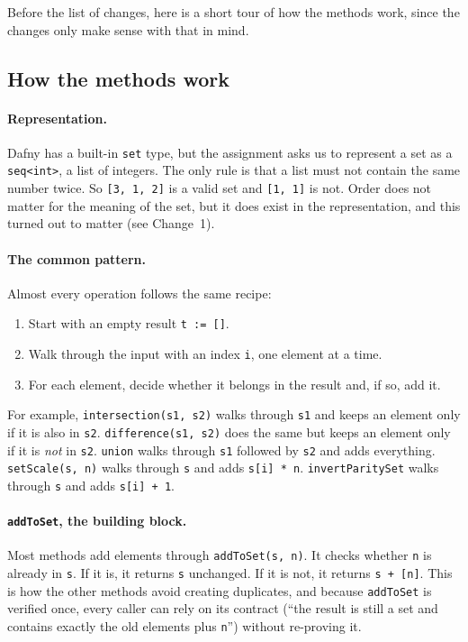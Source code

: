 \documentclass[11pt,a4paper]{article}
\begin{document}
Before the list of changes, here is a short tour of how the methods work, since the changes only make sense with that in mind.

\subsection{How the methods work}

\paragraph{Representation.} Dafny has a built-in \texttt{set} type, but the assignment asks us to represent a set as a \texttt{seq<int>}, a list of integers. The only rule is that a list must not contain the same number twice. So \texttt{[3, 1, 2]} is a valid set and \texttt{[1, 1]} is not. Order does not matter for the meaning of the set, but it does exist in the representation, and this turned out to matter (see Change~1).

\paragraph{The common pattern.} Almost every operation follows the same recipe:
\begin{enumerate}
  \item Start with an empty result \texttt{t := []}.
  \item Walk through the input with an index \texttt{i}, one element at a time.
  \item For each element, decide whether it belongs in the result and, if so, add it.
\end{enumerate}
For example, \texttt{intersection(s1, s2)} walks through \texttt{s1} and keeps an element only if it is also in \texttt{s2}. \texttt{difference(s1, s2)} does the same but keeps an element only if it is \emph{not} in \texttt{s2}. \texttt{union} walks through \texttt{s1} followed by \texttt{s2} and adds everything. \texttt{setScale(s, n)} walks through \texttt{s} and adds \texttt{s[i] * n}. \texttt{invertParitySet} walks through \texttt{s} and adds \texttt{s[i] + 1}.

\paragraph{\texttt{addToSet}, the building block.} Most methods add elements through \texttt{addToSet(s, n)}. It checks whether \texttt{n} is already in \texttt{s}. If it is, it returns \texttt{s} unchanged. If it is not, it returns \texttt{s + [n]}. This is how the other methods avoid creating duplicates, and because \texttt{addToSet} is verified once, every caller can rely on its contract (``the result is still a set and contains exactly the old elements plus \texttt{n}'') without re-proving it.
\end{document}
